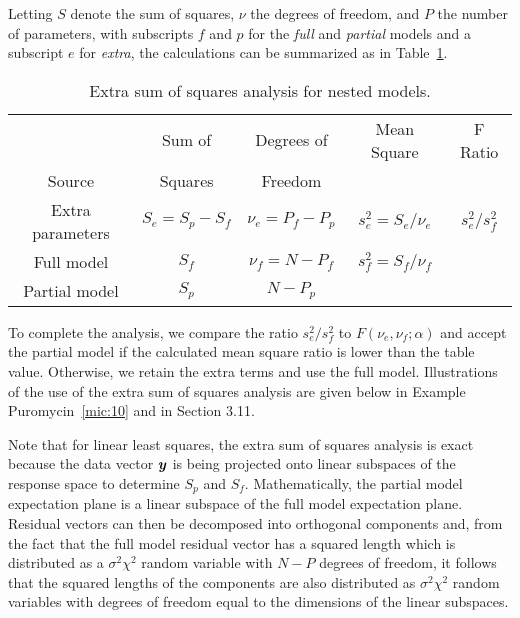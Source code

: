 Letting $S$ denote the sum of squares, $\nu$ the degrees of
freedom, and $P$ the number of parameters, with subscripts $f$
and $p$ for the {\em full\/}
and {\em partial\/} models and a subscript $e$
for {\em extra},
the calculations can be summarized as in
Table~\ref{tbl:extra}.
\begin{table}
  \caption{
  Extra sum of squares analysis for nested models.
  }\label{tbl:extra}
  \begin{center}
    \begin{tabular}{c  c  c  c  c} \hline
      & \multicolumn{1}{c}{Sum of} & \multicolumn{1}{c}{Degrees of}
      &\multicolumn{1}{c}{Mean Square} & \multicolumn{1}{c}{F Ratio}\\
      \multicolumn{1}{c}{Source} & \multicolumn{1}{c}{Squares}
      &\multicolumn{1}{c}{Freedom} \\ \hline Extra parameters&$S_e = S_p -
      S_{f}$& $\nu_e = P_f - P_{p}$&$s_e^2 = S_e / \nu_{e}$&
      ${s_e^2}/{s_f^2}$\\ Full model&$S_{f}$&$\nu_f = N - P_{f}$& $s_f^2 =
      S_f / \nu_{f}$\\ \hline Partial model&$S_{p}$&$N - P_{p}$\\ \hline
    \end{tabular}
  \end{center}
\end{table}
To complete the analysis, we compare the ratio $s_e^2 / s_f^{2}$ to
$F(\nu_e,\nu_f;\alpha)$ and accept the 
partial model if the calculated mean square ratio is lower than the
table value.
Otherwise, we retain the extra terms and use the full model.
Illustrations of the use of the extra sum of squares analysis are
given below in Example Puromycin~\ref{mic:10} and in Section 3.11.

Note that for linear least squares, the extra sum of squares
analysis is exact because the
data vector ${\boldsymbol y}$ is being projected onto linear subspaces of the
response space to determine $S_{p}$ and $S_{f}$.
Mathematically, the partial model
expectation plane is a linear subspace of the full model
expectation plane.
Residual vectors can then be decomposed into orthogonal
components and, from the fact that the full model residual vector
has a squared length which is distributed as a
$\sigma^2 \chi^{2}$ random variable with $N - P$ degrees of
freedom, it follows that the squared lengths of the components
are also distributed as $\sigma^2 \chi^{2}$ random variables
with degrees of freedom equal to the dimensions of the linear
subspaces.


